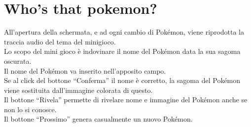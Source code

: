 \documentclass[a4paper,11pt]{article}
\begin{document}
\section{Who’s that pokemon?}
  All’apertura della schermata, e ad ogni cambio di Pokémon, viene riprodotta la traccia audio del tema del minigioco.\\
Lo scopo del mini gioco è indovinare il nome del Pokémon data la sua sagoma oscurata.\\
Il nome del Pokémon va inserito nell’apposito campo.\\
Se al click del bottone “Conferma” il nome è corretto, la sagoma del Pokémon viene sostituita dall’immagine colorata di questo.\\
Il bottone “Rivela” permette di rivelare nome e immagine del Pokémon anche se non lo si conosce.\\
Il bottone “Prossimo” genera casualmente un nuovo Pokémon.\\
\end{document}

